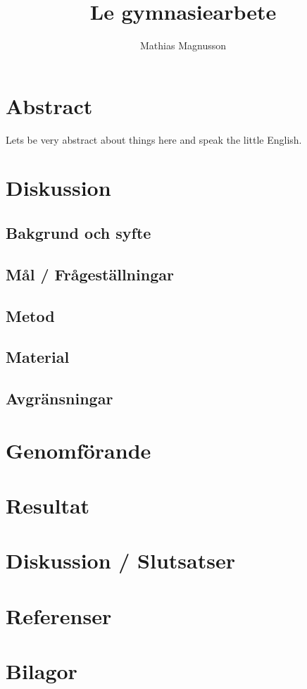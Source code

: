 \documentclass{article}
\author{Mathias Magnusson}
\title{Le gymnasiearbete}
\date{}
\begin{document}
\maketitle{}

\section*{Abstract}

Lets be very abstract about things here and speak the little English.

\tableofcontents

\section{Diskussion}

\subsection{Bakgrund och syfte}

\subsection{Mål / Frågeställningar}

\subsection{Metod}

\subsection{Material}

\subsection{Avgränsningar}

\section{Genomförande}

\section{Resultat}

\section{Diskussion / Slutsatser}

\section{Referenser}

\section{Bilagor}
\end{document}
